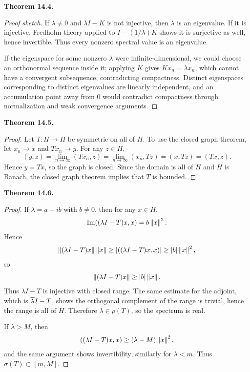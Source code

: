 \documentclass[11pt]{article}
\newenvironment{theoremstmt}[1]{%
  \par\medskip\noindent\textbf{Theorem #1. }\itshape
}{\par\medskip}
\begin{document}
\begin{theoremstmt}{14.4}
\thmCompactSpectrum
\end{theoremstmt}

\begin{proof}[Proof sketch]
If $\lambda\neq 0$ and $\lambda I-K$ is not injective, then $\lambda$ is an eigenvalue. If it is injective, Fredholm theory applied to $I-(1/\lambda)K$ shows it is surjective as well, hence invertible. Thus every nonzero spectral value is an eigenvalue.

If the eigenspace for some nonzero $\lambda$ were infinite-dimensional, we could choose an orthonormal sequence inside it; applying $K$ gives $Kx_n=\lambda x_n$, which cannot have a convergent subsequence, contradicting compactness. Distinct eigenspaces corresponding to distinct eigenvalues are linearly independent, and an accumulation point away from $0$ would contradict compactness through normalization and weak convergence arguments.
\end{proof}

\begin{theoremstmt}{14.5}
\thmHellingerToeplitz
\end{theoremstmt}

\begin{proof}
Let $T:H\to H$ be symmetric on all of $H$. To use the closed graph theorem, let $x_n\to x$ and $Tx_n\to y$. For any $z\in H$,
\[
(y,z)=\lim_{n\to\infty}(Tx_n,z)=\lim_{n\to\infty}(x_n,Tz)=(x,Tz)=(Tx,z).
\]
Hence $y=Tx$, so the graph is closed. Since the domain is all of $H$ and $H$ is Banach, the closed graph theorem implies that $T$ is bounded.
\end{proof}

\begin{theoremstmt}{14.6}
\thmSelfadjointSpectrumReal
\end{theoremstmt}

\begin{proof}
If $\lambda=a+ib$ with $b\neq 0$, then for any $x\in H$,
\[
\operatorname{Im}((\lambda I-T)x,x)=b\left\lVert x\right\rVert^2.
\]
Hence
\[
\left\lVert (\lambda I-T)x\right\rVert\left\lVert x\right\rVert\ge \left\lvert ((\lambda I-T)x,x)\right\rvert\ge \left\lvert b\right\rvert\left\lVert x\right\rVert^2,
\]
so
\[
\left\lVert (\lambda I-T)x\right\rVert\ge \left\lvert b\right\rvert\left\lVert x\right\rVert.
\]
Thus $\lambda I-T$ is injective with closed range. The same estimate for the adjoint, which is $\overline{\lambda} I-T$, shows the orthogonal complement of the range is trivial, hence the range is all of $H$. Therefore $\lambda\in\rho(T)$, so the spectrum is real.

If $\lambda>M$, then
\[
((\lambda I-T)x,x)\ge (\lambda-M)\left\lVert x\right\rVert^2,
\]
and the same argument shows invertibility; similarly for $\lambda<m$. Thus $\sigma(T)\subset[m,M]$.
\end{proof}
\end{document}
